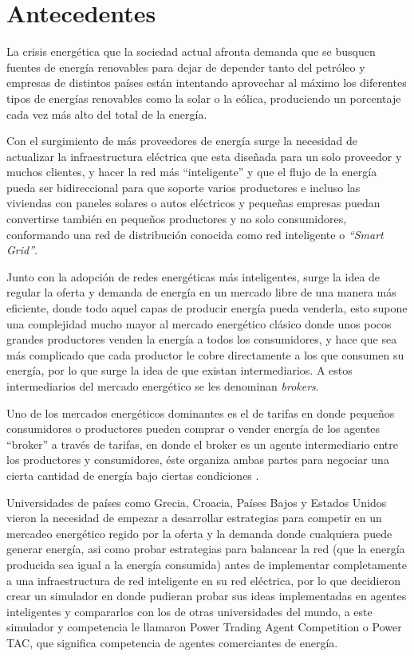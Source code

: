 \section{Antecedentes}

La crisis energética que la sociedad actual afronta demanda que se busquen fuentes de energía renovables para dejar de depender tanto del petróleo y empresas de distintos países están intentando aprovechar al máximo los diferentes tipos de energías renovables como la solar o la eólica, produciendo un porcentaje cada vez más alto del total de la  energía. 

Con el surgimiento de más proveedores de energía surge la necesidad de actualizar la infraestructura eléctrica que esta diseñada para un solo proveedor y muchos clientes, y hacer la red más ``inteligente'' y que el flujo de la energía pueda ser bidireccional para que soporte varios productores e incluso las viviendas con paneles solares o autos eléctricos y pequeñas empresas puedan convertirse también en pequeños productores y no solo consumidores, conformando una red de distribución conocida como red inteligente o \textit{``Smart Grid''}.

Junto con la adopción de redes energéticas más inteligentes, surge la idea de regular la oferta y demanda de energía en un mercado libre de una manera más eficiente, donde todo aquel capas de producir energía pueda venderla, esto supone una complejidad mucho mayor al mercado energético clásico donde unos pocos grandes productores venden la energía a todos los consumidores, y hace que sea más complicado que cada productor le cobre directamente a los que consumen su energía, por lo que surge la idea de que existan intermediarios. A estos intermediarios del mercado energético se les denominan \textit{brokers}.

Uno de los mercados energéticos dominantes es el de tarifas en donde pequeños consumidores o productores pueden comprar o vender energía de los agentes ``broker'' a través de tarifas, en donde el broker es un agente intermediario entre los productores y consumidores, éste organiza ambas partes para negociar una cierta cantidad de energía bajo ciertas condiciones \cite{MPAlonsoAYRGonzalezDesarrolloDeTec}.

Universidades de países como Grecia, Croacia, Países Bajos y Estados Unidos vieron la necesidad de empezar a desarrollar estrategias para competir en un mercadeo energético regido por la oferta y la demanda donde cualquiera puede generar energía, asi como probar estrategias para balancear la red (que la energía producida sea igual a la energía consumida) antes de implementar completamente a una infraestructura de red inteligente en su red eléctrica, por lo que decidieron crear un simulador en donde pudieran probar sus ideas implementadas en agentes inteligentes y compararlos con los de otras universidades del mundo, a este simulador y competencia le llamaron Power Trading Agent Competition o Power TAC, que significa competencia de agentes comerciantes de energía.

